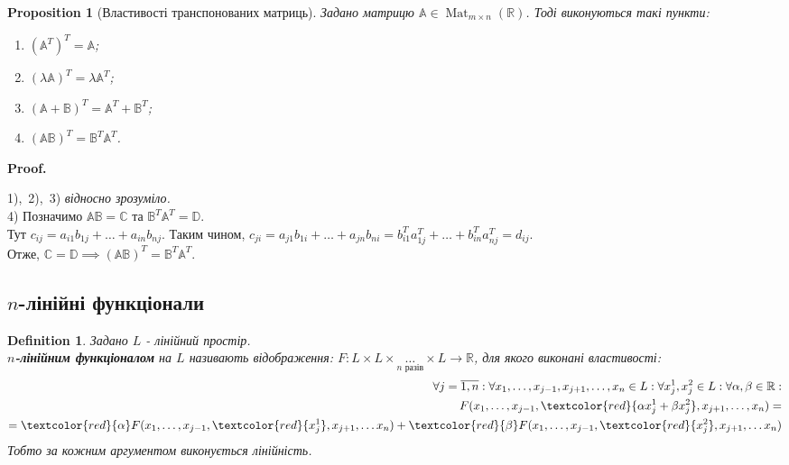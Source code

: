 \documentclass[a4paper, 10pt]{article}
\makeatletter
\theoremstyle{theoremdd}
\newtheorem{definition}[theorem]{Definition}
\newtheorem{proposition}[theorem]{Proposition}
\DeclareMathOperator{\Mat}{Mat}
\renewenvironment{proof}[1][Proof.\\]{\par
\pushQED{\hfill \qed}%
\normalfont \topsep6\p@\@plus6\p@\relax
\trivlist
\item\relax
{\bfseries
#1\@addpunct{.}}\hspace\labelsep\ignorespaces
}{%
\popQED\endtrivlist\@endpefalse
}
\makeatother
\begin{document}
	\begin{proposition}[Властивості транспонованих матриць]
	Задано матрицю $\mathbb{A} \in \Mat_{m \times n}(\mathbb{R})$. Тоді виконуються такі пункти:
	\begin{enumerate}[nosep, wide=0pt, label={\arabic*)}]
	\item $(\mathbb{A}^T)^T = \mathbb{A}$;
	\item $(\lambda \mathbb{A})^T = \lambda \mathbb{A}^T$;
	\item $(\mathbb{A} + \mathbb{B})^T = \mathbb{A}^T + \mathbb{B}^T$;
	\item $(\mathbb{A} \mathbb{B})^T = \mathbb{B}^T \mathbb{A}^T$.
	\end{enumerate}
	\end{proposition}
	
	\begin{proof}
	1),\ 2),\ 3) \textit{відносно зрозуміло.}\\
	4) Позначимо $\mathbb{A} \mathbb{B} = \mathbb{C}$ та $\mathbb{B}^T \mathbb{A}^T = \mathbb{D}$.\\
	Тут $c_{ij} = a_{i1}b_{1j} + \dots + a_{in}b_{nj}$. Таким чином, $c_{ji} = a_{j1}b_{1i} + \dots + a_{jn}b_{ni} = b_{i1}^T a_{1j}^T + \dots + b_{in}^T a_{nj}^T = d_{ij}$.\\
	Отже, $\mathbb{C} = \mathbb{D} \implies (\mathbb{A} \mathbb{B})^T = \mathbb{B}^T \mathbb{A}^T$.
	\end{proof}

	
	\subsection{$n$-лінійні функціонали}
	\begin{definition}
	Задано $L$ - лінійний простір.\\
	\textbf{$n$-лінійним функціоналом} на $L$ називають відображення: $F \colon L \times L \times \underset{n\text{ разів}}{\dots} \times L \to \mathbb{R}$, для якого виконані властивості:
	\begin{align*}
	\forall j = \overline{1,n}: \forall x_1,\dots,x_{j-1}, x_{j+1}, \dots, x_n \in L: \forall x_j^1, x_j^2 \in L: \forall \alpha, \beta \in \mathbb{R}:\\
	F(x_1,\dots,x_{j-1}, \textcolor{red}{\alpha x_j^1 + \beta x_j^2}, x_{j+1}, \dots, x_n) = \\ = \textcolor{red}{\alpha} F(x_1, \dots, x_{j-1}, \textcolor{red}{x_j^1}, x_{j+1}, \dots x_n) + \textcolor{red}{\beta} F(x_1, \dots, x_{j-1}, \textcolor{red}{x_j^2}, x_{j+1}, \dots x_n)
	\end{align*}
	Тобто за кожним аргументом виконується лінійність.
	\end{definition}
	
\end{document}
